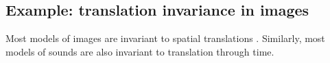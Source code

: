 

%




\subsection{Example: translation invariance in images}

Most models of images are invariant to spatial translations \citep{lecun1995convolutional}.
Similarly, most models of sounds are also invariant to translation through time.

